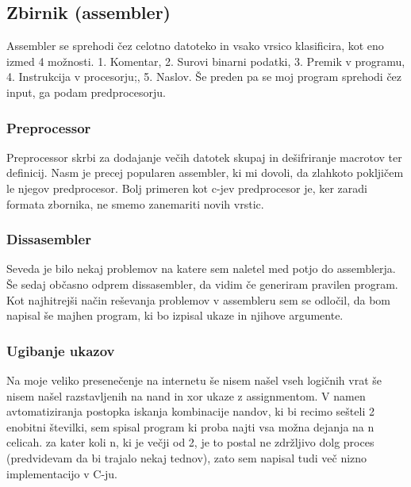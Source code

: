 \documentclass[12pt]{article}
\begin{document}
\subsection{Zbirnik (assembler)}
Assembler se sprehodi čez celotno datoteko in vsako vrsico klasificira, kot eno izmed 4 možnosti.
1. Komentar,
2. Surovi binarni podatki,
3. Premik v programu,
4. Instrukcija v procesorju;,
5. Naslov.
Še preden pa se moj program sprehodi čez input, ga podam predprocesorju.
\subsubsection{Preprocessor}
Preprocessor skrbi za dodajanje večih datotek skupaj in dešifriranje macrotov ter definicij.
Nasm je precej popularen assembler, ki mi dovoli, da zlahkoto pokljičem le njegov predprocesor.
Bolj primeren kot c-jev predprocesor je, ker zaradi formata zbornika, ne smemo zanemariti novih vrstic.
\subsubsection{Dissasembler}
Seveda je bilo nekaj problemov na katere sem naletel med potjo do assemblerja.
Še sedaj občasno odprem dissasembler, da vidim če generiram pravilen program.
Kot najhitrejši način reševanja problemov v assembleru sem se odločil, da bom napisal še majhen program, ki bo izpisal ukaze in njihove argumente.

\subsubsection{Ugibanje ukazov}
Na moje veliko presenečenje na internetu še nisem našel vseh logičnih vrat še nisem našel razstavljenih na nand in xor ukaze z assignmentom.
V namen avtomatiziranja postopka iskanja kombinacije nandov, ki bi recimo sešteli 2 enobitni številki, sem spisal program ki proba najti vsa možna dejanja na n celicah.
za kater koli n, ki je večji od 2, je to postal ne zdržljivo dolg proces (predvidevam da bi trajalo nekaj tednov),  zato sem napisal tudi več nizno implementacijo v C-ju.

\end{document}

